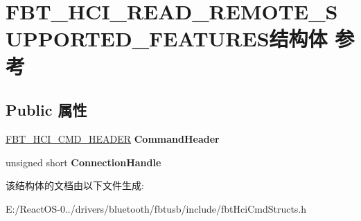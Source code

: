 \hypertarget{struct_f_b_t___h_c_i___r_e_a_d___r_e_m_o_t_e___s_u_p_p_o_r_t_e_d___f_e_a_t_u_r_e_s}{}\section{F\+B\+T\+\_\+\+H\+C\+I\+\_\+\+R\+E\+A\+D\+\_\+\+R\+E\+M\+O\+T\+E\+\_\+\+S\+U\+P\+P\+O\+R\+T\+E\+D\+\_\+\+F\+E\+A\+T\+U\+R\+E\+S结构体 参考}
\label{struct_f_b_t___h_c_i___r_e_a_d___r_e_m_o_t_e___s_u_p_p_o_r_t_e_d___f_e_a_t_u_r_e_s}
\subsection*{Public 属性}
\begin{DoxyCompactItemize}
\item 
\mbox{\label{struct_f_b_t___h_c_i___r_e_a_d___r_e_m_o_t_e___s_u_p_p_o_r_t_e_d___f_e_a_t_u_r_e_s_a47acdd9bb1da034bdab3cf879068a4ff}} 
\hyperlink{struct_f_b_t___h_c_i___c_m_d___h_e_a_d_e_r}{F\+B\+T\+\_\+\+H\+C\+I\+\_\+\+C\+M\+D\+\_\+\+H\+E\+A\+D\+ER} {\bfseries Command\+Header}
\item 
\mbox{\label{struct_f_b_t___h_c_i___r_e_a_d___r_e_m_o_t_e___s_u_p_p_o_r_t_e_d___f_e_a_t_u_r_e_s_abb63461542a9015528ae0f42522b8c2a}} 
unsigned short {\bfseries Connection\+Handle}
\end{DoxyCompactItemize}


该结构体的文档由以下文件生成\+:\begin{DoxyCompactItemize}
\item 
E\+:/\+React\+O\+S-\/0../drivers/bluetooth/fbtusb/include/fbt\+Hci\+Cmd\+Structs.\+h\end{DoxyCompactItemize}
